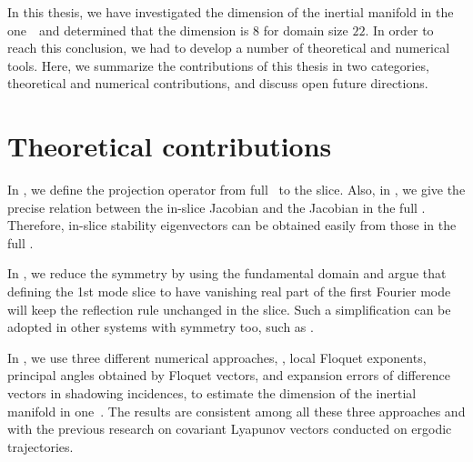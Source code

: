 In this thesis, we have investigated the dimension of the inertial manifold
in the one\dmn\ \KSe\ and determined that the dimension is 8 for domain size $22$.
In order to reach this conclusion, we had to develop a number of
theoretical and numerical tools. Here, we summarize the contributions of
this thesis in two categories, theoretical and numerical contributions,
and discuss open future directions.


\section{Theoretical contributions}

In , we define the projection operator from
full \statesp\ to the slice. Also, in ,
we give the precise relation between the
in-slice Jacobian and the Jacobian in the full \statesp. Therefore,
in-slice stability eigenvectors can be obtained easily from those
in the full \statesp.


In , we reduce the  symmetry by using the
fundamental domain and argue that defining the 1st mode slice
to have vanishing real part of the first Fourier mode will keep
the reflection rule unchanged in the slice.
Such a simplification can be adopted in other systems with
 symmetry too, such as \cGLe.

In , we use three different numerical approaches, \ie,
local Floquet exponents, principal angles obtained by Floquet vectors, and expansion errors of
difference vectors in shadowing incidences, to estimate the dimension of
the inertial manifold in one\dmn\ \KSe. The results are consistent among
all these three approaches and with the previous research on covariant
Lyapunov vectors conducted on ergodic trajectories.


